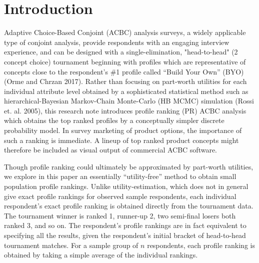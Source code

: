\documentclass[a4paper, 12pt]{article}
\begin{document}
 
 \vspace{1in}
 
\section{Introduction}

Adaptive Choice-Based Conjoint (ACBC) analysis surveys, a widely applicable type of conjoint analysis, provide respondents with an engaging interview experience, and can be designed with a  single-elimination, "head-to-head" (2 concept choice) tournament beginning with profiles which are representative of concepts close to the respondent's \#1 profile called  ``Build Your Own'' (BYO) (Orme and Chrzan 2017). Rather than focusing on part-worth utilities for each individual attribute level  obtained by a sophisticated statistical method such as hierarchical-Bayesian Markov-Chain Monte-Carlo (HB MCMC) simulation (Rossi et. al. 2005), this research note introduces profile ranking (PR) ACBC analysis which obtains the top ranked profiles by a conceptually simpler discrete probability model. In survey marketing of product options, the importance of such a ranking is immediate. A lineup of top ranked product concepts might therefore be included as visual output of commercial ACBC software.  

Though profile ranking could ultimately be approximated by part-worth utilities, we explore in this paper an essentially ``utility-free'' method to obtain small population profile rankings. Unlike utility-estimation, which does not in general give exact profile rankings for observed sample respondents, each individual respondent's exact profile ranking is obtained directly from the tournament data. The tournament winner is ranked 1, runner-up 2, two semi-final losers both ranked 3, and so on.  The respondent's profile rankings are in fact equivalent to specifying all the results, given the respondent's initial bracket of head-to-head tournament matches.  For a sample group of $n$ respondents, each profile ranking is obtained by taking a simple  average of the individual rankings. 
\end{document}
